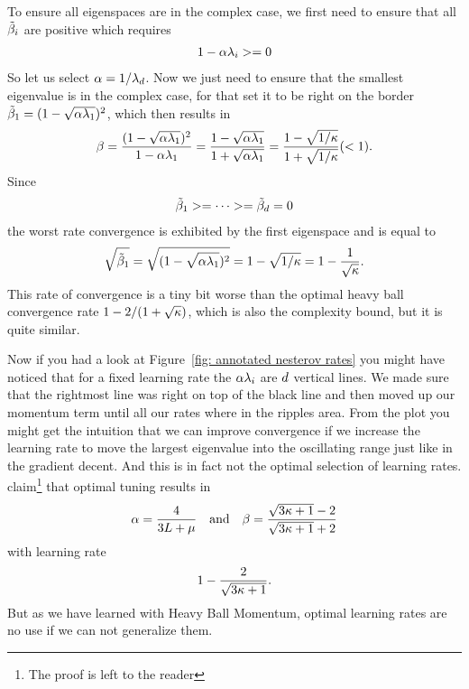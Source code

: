To ensure all eigenspaces are in the complex case, we first need to ensure that
all \(\tilde{\beta}_i\) are positive which requires
\begin{align*}
	1-\alpha\lambda_i >= 0
\end{align*}
So let us select \(\alpha= 1/\lambda_d\). Now we just need to ensure
that the smallest eigenvalue is in the complex case, for that set it to be
right on the border \(\tilde{\beta}_1=(1-\sqrt{\alpha\lambda_1})^2\),
which then results in
\begin{align*}
	\beta = \frac{(1-\sqrt{\alpha\lambda_1})^2}{1-\alpha\lambda_1}
	=\frac{1-\sqrt{\alpha\lambda_1}}{1+\sqrt{\alpha\lambda_1}}
	=\frac{1-\sqrt{1/\kappa}}{1+\sqrt{1/\kappa}} (< 1).
\end{align*}
Since
\begin{align*}
	\tilde{\beta}_1 >= \dots >=\tilde{\beta}_d=0
\end{align*}
the worst rate convergence is exhibited by the first eigenspace and is equal to
\begin{align}\label{eq: nesterov convegence rate eigenvalue derivation}
	\sqrt{\tilde{\beta}_1} = \sqrt{(1-\sqrt{\alpha\lambda_1})^2}
	= 1-\sqrt{1/\kappa} = 1- \frac{1}{\sqrt{\kappa}}.
\end{align}
%
This rate of convergence is a tiny bit worse than the optimal heavy ball
convergence rate \(1-2/(1+\sqrt{\kappa})\), which is also the complexity
bound, but it is quite similar.

Now if you had a look at Figure~\ref{fig:
annotated nesterov rates} you might have noticed that for a fixed learning
rate the \(\alpha\lambda_i\) are \(d\) vertical lines. We made sure
that the rightmost line was right on top of the black line and then moved up
our momentum term until all our rates where in the ripples area. From the
plot you might get the intuition that we can improve convergence if we
increase the learning rate to move the largest eigenvalue into the oscillating
range just like in the gradient decent. And this is in fact not the optimal
selection of learning rates. \textcite{lessardAnalysisDesignOptimization2016}
claim\footnote{The proof is left to the reader} that optimal tuning results in
\begin{align*}
	\alpha = \frac{4}{3L + \mu}
	\quad \text{and} \quad
	\beta = \frac{\sqrt{3\kappa+1}-2}{\sqrt{3\kappa+1}+2}
\end{align*}
with learning rate
\begin{align*}
	1-\frac{2}{\sqrt{3\kappa+1}}.
\end{align*}
But as we have learned with
Heavy Ball Momentum, optimal learning rates are no use if we can not generalize
them.

